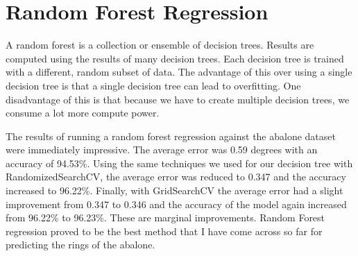 \section{Random Forest Regression}

A random forest is a collection or ensemble of decision trees. Results are computed using  the results of many decision trees. Each decision tree is trained with a different, random subset of data. The advantage of this over using a single decision tree is that a single decision tree can lead to overfitting. One disadvantage of this is that because we have to create multiple decision trees, we consume a lot more compute power.

The results of running a random forest regression against the abalone dataset were immediately impressive. The average error was 0.59 degrees with an accuracy of 94.53\%. Using the same techniques we used for our decision tree with RandomizedSearchCV, the average error was reduced to 0.347 and the accuracy increased to 96.22\%. Finally, with GridSearchCV the average error had a slight improvement from 0.347 to 0.346 and the accuracy of the model again increased from 96.22\% to 96.23\%. These are marginal improvements. 
Random Forest regression proved to be the best method that I have come across so far for predicting the rings of the abalone.

